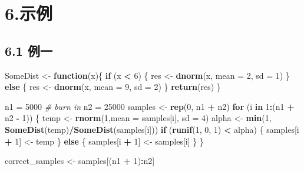 \documentclass[]{article}
\newenvironment{Shaded}{\begin{snugshade}}{\end{snugshade}}
\newcommand{\KeywordTok}[1]{\textcolor[rgb]{0.13,0.29,0.53}{\textbf{#1}}}
\newcommand{\DataTypeTok}[1]{\textcolor[rgb]{0.13,0.29,0.53}{#1}}
\newcommand{\DecValTok}[1]{\textcolor[rgb]{0.00,0.00,0.81}{#1}}
\newcommand{\StringTok}[1]{\textcolor[rgb]{0.31,0.60,0.02}{#1}}
\newcommand{\CommentTok}[1]{\textcolor[rgb]{0.56,0.35,0.01}{\textit{#1}}}
\newcommand{\ControlFlowTok}[1]{\textcolor[rgb]{0.13,0.29,0.53}{\textbf{#1}}}
\newcommand{\OperatorTok}[1]{\textcolor[rgb]{0.81,0.36,0.00}{\textbf{#1}}}
\newcommand{\NormalTok}[1]{#1}
\begin{document}
\section{6.示例}\label{-1}

\subsection{6.1 例一}

\begin{Shaded}
\begin{Highlighting}[]
\NormalTok{SomeDist <-}\StringTok{ }\ControlFlowTok{function}\NormalTok{(x)\{}
  \ControlFlowTok{if}\NormalTok{ (x }\OperatorTok{<}\StringTok{ }\DecValTok{6}\NormalTok{) \{}
\NormalTok{    res <-}\StringTok{ }\KeywordTok{dnorm}\NormalTok{(x, }\DataTypeTok{mean =} \DecValTok{2}\NormalTok{, }\DataTypeTok{sd =} \DecValTok{1}\NormalTok{)}
\NormalTok{  \} }\ControlFlowTok{else}\NormalTok{ \{}
\NormalTok{    res <-}\StringTok{ }\KeywordTok{dnorm}\NormalTok{(x, }\DataTypeTok{mean =} \DecValTok{9}\NormalTok{, }\DataTypeTok{sd =} \DecValTok{2}\NormalTok{)}
\NormalTok{  \}}
  \KeywordTok{return}\NormalTok{(res)}
\NormalTok{\}}
 
\NormalTok{n1 =}\StringTok{ }\DecValTok{5000}  \CommentTok{# burn in}
\NormalTok{n2 =}\StringTok{ }\DecValTok{25000}
\NormalTok{samples <-}\StringTok{ }\KeywordTok{rep}\NormalTok{(}\DecValTok{0}\NormalTok{, n1 }\OperatorTok{+}\StringTok{ }\NormalTok{n2)}
\ControlFlowTok{for}\NormalTok{ (i }\ControlFlowTok{in} \DecValTok{1}\OperatorTok{:}\NormalTok{(n1 }\OperatorTok{+}\StringTok{ }\NormalTok{n2 }\OperatorTok{-}\StringTok{ }\DecValTok{1}\NormalTok{)) \{}
\NormalTok{  temp <-}\StringTok{ }\KeywordTok{rnorm}\NormalTok{(}\DecValTok{1}\NormalTok{,}\DataTypeTok{mean =}\NormalTok{ samples[i], }\DataTypeTok{sd =} \DecValTok{4}\NormalTok{)}
\NormalTok{  alpha <-}\StringTok{ }\KeywordTok{min}\NormalTok{(}\DecValTok{1}\NormalTok{, }\KeywordTok{SomeDist}\NormalTok{(temp)}\OperatorTok{/}\KeywordTok{SomeDist}\NormalTok{(samples[i]))}
  \ControlFlowTok{if}\NormalTok{ (}\KeywordTok{runif}\NormalTok{(}\DecValTok{1}\NormalTok{, }\DecValTok{0}\NormalTok{, }\DecValTok{1}\NormalTok{) }\OperatorTok{<}\StringTok{ }\NormalTok{alpha) \{}
\NormalTok{    samples[i }\OperatorTok{+}\StringTok{ }\DecValTok{1}\NormalTok{] <-}\StringTok{ }\NormalTok{temp}
\NormalTok{  \} }\ControlFlowTok{else}\NormalTok{ \{}
\NormalTok{    samples[i }\OperatorTok{+}\StringTok{ }\DecValTok{1}\NormalTok{] <-}\StringTok{ }\NormalTok{samples[i]}
\NormalTok{  \}}
\NormalTok{\}}

\NormalTok{correct_samples <-}\StringTok{ }\NormalTok{samples[(n1 }\OperatorTok{+}\StringTok{ }\DecValTok{1}\NormalTok{)}\OperatorTok{:}\NormalTok{n2]}
\end{Highlighting}
\end{Shaded}
\end{document}
